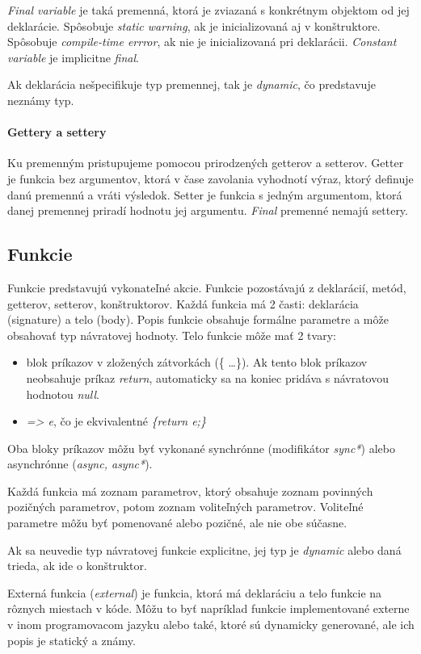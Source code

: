 \emph{Final variable} je taká premenná, ktorá je zviazaná s konkrétnym objektom od jej deklarácie. Spôsobuje \emph{static warning}, ak je inicializovaná aj v konštruktore. Spôsobuje \emph{compile-time errror}, ak nie je inicializovaná pri deklarácii.
\emph{Constant variable} je implicitne \emph{final}.

Ak deklarácia nešpecifikuje typ premennej, tak je \emph{dynamic}, čo predstavuje neznámy typ.

\paragraph{Gettery a settery}
\label{par:getters}
Ku premenným pristupujeme pomocou prirodzených getterov a setterov. 
Getter je funkcia bez argumentov, ktorá v čase zavolania vyhodnotí výraz, ktorý definuje danú premennú a vráti výsledok.
Setter je funkcia s jedným argumentom, ktorá danej premennej priradí hodnotu jej argumentu. \emph{Final} premenné nemajú settery.

\subsection{Funkcie}
Funkcie predstavujú vykonateľné akcie. Funkcie pozostávajú z deklarácií, metód, getterov, setterov, konštruktorov. %
Každá funkcia má 2 časti: deklarácia (signature) a telo (body). Popis funkcie obsahuje formálne parametre a môže obsahovať typ návratovej hodnoty. Telo funkcie môže mať 2 tvary:
\begin{itemize}
\item blok príkazov v zložených zátvorkách (\{ \ldots \}). Ak tento blok príkazov neobsahuje príkaz \emph{return}, automaticky sa na koniec pridáva s návratovou hodnotou \emph{null}.
\item \emph{=> e}, čo je ekvivalentné \emph{\{return e;\}}
\end{itemize}
Oba bloky príkazov môžu byť vykonané synchrónne (modifikátor \emph{sync*}) alebo asynchrónne (\emph{async, async*}).

Každá funkcia má zoznam parametrov, ktorý obsahuje zoznam povinných pozičných parametrov, potom zoznam voliteľných parametrov. Voliteľné parametre môžu byť pomenované alebo pozičné, ale nie obe súčasne.

Ak sa neuvedie typ návratovej funkcie explicitne, jej typ je \emph{dynamic} alebo daná trieda, ak ide o konštruktor.

Externá funkcia (\emph{external}) je funkcia, ktorá má deklaráciu a telo funkcie na rôznych miestach v kóde. Môžu to byť napríklad funkcie implementované externe v inom programovacom jazyku alebo také, ktoré sú dynamicky generované, ale ich popis je statický a známy.

